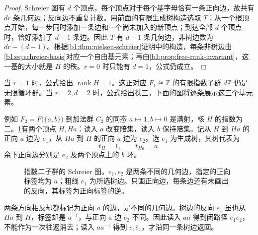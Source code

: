 \begin{proof}
	Schreier 图有 \(d\) 个顶点，每个顶点对于每个基字母恰有一条正向边，故共有 \(dr\) 条几何边；反向边不重复计数。用前面的有限生成树构造选取 \(T\)：从一个根顶点开始，每一步同时添加一条边和一个尚未加入的新顶点；到达全部 \(d\) 个顶点时，恰好添加了 \(d-1\) 条边。因此 \(T\) 有 \(d-1\) 条几何边，非树边数为 \(dr-(d-1)\)。根据\cref{b1:thm:nielsen-schreier}证明中的构造，每条非树边由\eqref{b1:eq:schreier-basis}对应一个自由基元素；再由\cref{b1:prop:free-rank-invariant}，这一基的大小就是 \(H\) 的秩。\(r=0\) 时只能有 \(d=1\)，公式仍成立。
\end{proof}

当 \(r=1\) 时，公式给出 \(\operatorname{rank}H=1\)。这正对应 \(F_1\cong\mathbb Z\) 的有限指数子群 \(d\mathbb Z\) 仍是无限循环群。当 \(r=2,d=2\) 时，公式给出秩三，下面的图将逐条展示这三个基元素。

\ProseParagraphBreak
例如 \(F_2=F\bigl(\{a,b\}\bigr)\) 到加法群 \(C_2\) 的同态 \(a\mapsto1,b\mapsto0\) 是满射，核 \(H\) 的指数为二。\cref{b1:fig:schreier-index-two}有两个顶点 \(H,Ha\)：读入 \(a\) 改变陪集，读入 \(b\) 保持陪集。记从 \(H\) 到 \(Ha\) 的正向 \(a\) 边为 \(e_1\)，从 \(Ha\) 到 \(H\) 的正向 \(a\) 边为 \(e_2\)。选 \(e_1\) 为生成树，其树代表为
\[
	t_H=1,\qquad t_{Ha}=a.
\]
余下正向边分别是 \(e_2\) 及两个顶点上的 \(b\) 环。

\begin{figure}[htbp]
	\centering
	\caption[指数二子群的 Schreier 图]{指数二子群的 Schreier 图。\(e_1,e_2\) 是两条不同的几何边，指定的正向标签均为 \(a\)；粗线 \(e_1\) 为所选树边。只画正向边，每条边还有未画出的反向，其标签为正向标签的逆。}
	\label{b1:fig:schreier-index-two}
\end{figure}

两条方向相反却都标记为正向 \(a\) 的边，是不同的几何边。树边的反向 \(\bar e_1\) 虽也从 \(Ha\) 到 \(H\)，标签却是 \(a^{-1}\)，与正向 \(a\) 边 \(e_2\) 不同。因此读入 \(aa\) 得到闭路径 \(e_1e_2\)，不能作为一次往返消去；读入 \(aa^{-1}\) 得到 \(e_1\bar e_1\)，才沿同一条树边返回。

